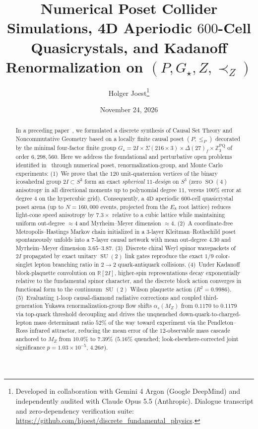 \documentclass[11pt,a4paper]{article}
\title{\textbf{Numerical Poset Collider Simulations, 4D Aperiodic $600$-Cell Quasicrystals, and Kadanoff Renormalization on $(P, G_\star, Z, \prec_Z)$}}
\author{Holger Joest\thanks{Developed in collaboration with Gemini 4 Argon (Google DeepMind) and independently audited with Claude Opus 5.5 (Anthropic). Dialogue transcript and zero-dependency verification suite: \url{https://github.com/hjoest/discrete_fundamental_physics}.}}
\date{November 24, 2026}
\theoremstyle{definition}
\theoremstyle{remark}
\newcommand{\R}{\mathbb{R}}
\newcommand{\Z}{\mathbb{Z}}
\newcommand{\SU}{\operatorname{SU}}
\newcommand{\SO}{\operatorname{SO}}
\newcommand{\Gstar}{G_\star}
\begin{document}
\maketitle

\begin{abstract}
In a preceding paper~\cite{PaperI}, we formulated a discrete synthesis of Causal Set Theory and Noncommutative Geometry based on a locally finite causal poset $(P, \le_P)$ decorated by the minimal four-factor finite group $\Gstar = 2I \times \Sigma(216 \times 3) \times \Delta(27)_f \times \Z_3^{\mathrm{PQ}}$ of order $6{,}298{,}560$. Here we address the foundational and perturbative open problems identified in~\cite{PaperI} through numerical poset, renormalization-group, and Monte Carlo experiments:
(1)~We prove that the $120$ unit-quaternion vertices of the binary icosahedral group $2I \subset S^3$ form an exact \emph{spherical $11$-design} on $S^3$ (zero $\SO(4)$ anisotropy in all directional moments up to polynomial degree $11$, versus $100\%$ error at degree $4$ on the hypercubic grid). Consequently, a $4\text{D}$ aperiodic $600$-cell quasicrystal poset arena (up to $N = 160{,}000$ events, projected from the $E_8$ root lattice) reduces light-cone speed anisotropy by $7.3\times$ relative to a cubic lattice while maintaining uniform out-degree $\approx 4$ and Myrheim--Meyer dimension $\approx 4$.
(2)~A coordinate-free Metropolis--Hastings Markov chain initialized in a $3$-layer Kleitman--Rothschild poset spontaneously unfolds into a $7$-layer causal network with mean out-degree $4.30$ and Myrheim--Meyer dimension $3.65\text{--}3.87$.
(3)~Discrete chiral Weyl spinor wavepackets of $2I$ propagated by exact unitary $\SU(2)$ link gates reproduce the exact $1/9$ color-singlet lepton branching ratio in $2 \to 2$ quark-antiquark collisions.
(4)~Under Kadanoff block-plaquette convolution on $\R[2I]$, higher-spin representations decay exponentially relative to the fundamental spinor character, and the discrete block action converges in functional form to the continuum $\SU(2)$ Wilson plaquette action ($R^2 = 0.9986$).
(5)~Evaluating $1$-loop causal-diamond radiative corrections and coupled third-generation Yukawa renormalization-group flow shifts $\alpha_s(M_Z)$ from $0.1170$ to $0.1179$ via top-quark threshold decoupling and drives the unquenched down-quark-to-charged-lepton mass determinant ratio $52\%$ of the way toward experiment via the Pendleton--Ross infrared attractor, reducing the mean error of the $12$-observable mass cascade anchored to $M_Z$ from $10.0\%$ to $7.39\%$ ($5.16\%$ quenched; look-elsewhere-corrected joint significance $p = 1.03 \times 10^{-5}$, $4.26\sigma$).
\end{abstract}
\end{document}
